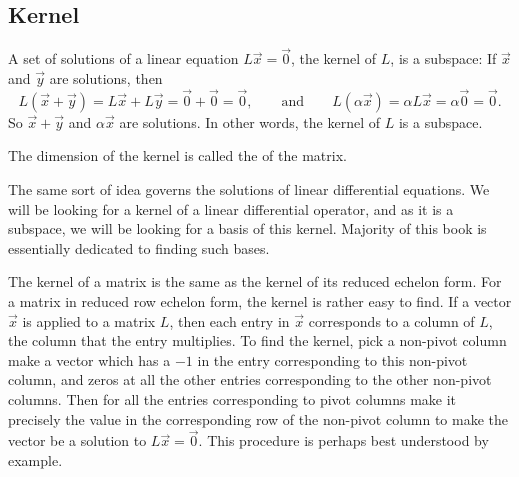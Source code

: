 \subsection{Kernel}

A set of solutions of a linear equation $L\vec{x} = \vec{0}$, 
the kernel of $L$, is a subspace:
If $\vec{x}$ and $\vec{y}$ are solutions,
then
\begin{equation*}
L(\vec{x}+\vec{y}) = 
L\vec{x}+L\vec{y} = 
\vec{0}+\vec{0} = \vec{0} ,
\qquad \text{and} \qquad
L(\alpha \vec{x}) = 
\alpha L \vec{x} = 
\alpha \vec{0} = \vec{0}.
\end{equation*}
So $\vec{x}+\vec{y}$ and $\alpha \vec{x}$ are solutions.  In other words,
the kernel of $L$ is a subspace.

The dimension of the kernel is called the \emph{} of the
matrix.

The same sort of idea governs the solutions of linear differential
equations.  We will be looking for a kernel of a linear differential 
operator, and as it is a subspace, we will be looking for a basis of this
kernel.  Majority of this book is essentially dedicated to finding
such bases.

The kernel of a matrix is the same as the kernel of its reduced echelon
form.  For a matrix in reduced row echelon form, the kernel is rather easy to
find.  If a vector $\vec{x}$ is applied to a matrix $L$, then each entry in
$\vec{x}$ corresponds to a column of $L$, the column that the entry
multiplies.
To find the kernel,
pick a 
non-pivot column make a vector which has a $-1$ in the entry
corresponding to this non-pivot column, and zeros at all the other entries
corresponding to the other non-pivot columns.
Then for all the entries
corresponding to pivot columns make it precisely the value in the
corresponding row of the non-pivot column to make the vector be a
solution to $L \vec{x} = \vec{0}$.
This procedure is perhaps best understood by example.

